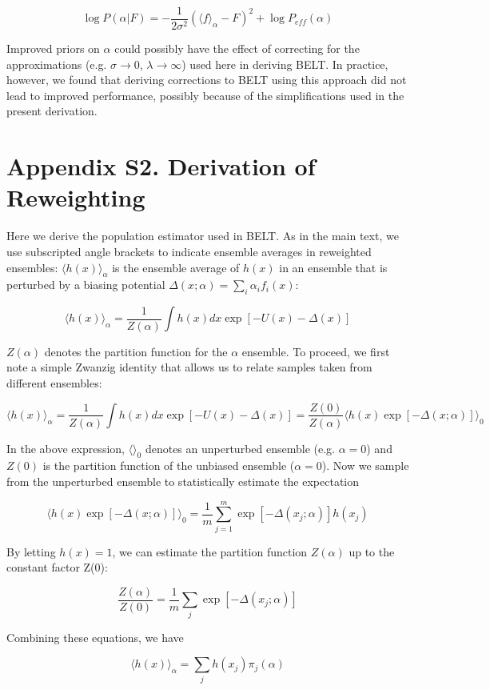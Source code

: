 \documentclass[12pt]{article}
\begin{document}
$$\log P(\alpha | F) = -\frac{1}{2\sigma^2} (\langle f \rangle_\alpha - F)^2 + \log P_{eff}(\alpha)$$

Improved priors on $\alpha$ could possibly have the effect of correcting for the approximations (e.g. $\sigma\rightarrow 0$, $\lambda \rightarrow \infty$) used here in deriving BELT.  In practice, however, we found that deriving corrections to BELT using this approach did not lead to improved performance, possibly because of the simplifications used in the present derivation.  


\section*{Appendix S2.  Derivation of Reweighting}

Here we derive the population estimator used in BELT.  As in the main text, we use subscripted angle brackets to indicate ensemble averages in reweighted ensembles: $\langle h(x)\rangle _\alpha$ is the ensemble average of $h(x)$ in an ensemble that is perturbed by a biasing potential $\Delta (x;\alpha) = \sum_i \alpha_i f_i(x)$:

$$\langle h(x)\rangle _\alpha = \frac{1}{Z(\alpha)} \int h(x) dx \exp[ -U(x) - \Delta(x)]$$

$Z(\alpha)$ denotes the partition function for the $\alpha$ ensemble.  To proceed, we first note a simple Zwanzig identity that allows us to relate samples taken from different ensembles:

$$\langle h(x)\rangle _\alpha = \frac{1}{Z(\alpha)} \int h(x) dx \exp[ -U(x) - \Delta(x)] = \frac{Z(0)}{Z(\alpha)} \langle h(x) \exp[-\Delta(x;\alpha)]\rangle _0 $$

In the above expression, $\langle \rangle_0$ denotes an unperturbed ensemble (e.g. $\alpha = 0$) and $Z(0)$ is the partition function of the unbiased ensemble ($\alpha = 0$).  Now we sample from the unperturbed ensemble to statistically estimate the expectation

$$\langle h(x) \exp[-\Delta(x;\alpha)]\rangle _0 = \frac{1}{m} \sum_{j = 1}^{m} \exp [ - \Delta(x_j;\alpha)] h(x_j)$$

By letting $h(x) = 1$, we can estimate the partition function $Z(\alpha)$ up to the constant factor Z(0):

$$ \frac{Z(\alpha)}{Z(0)} = \frac{1}{m} \sum_j \exp[-\Delta(x_j;\alpha)]$$

Combining these equations, we have

$$\langle h(x)\rangle _\alpha = \sum_j h(x_j) \pi_j(\alpha)$$
\end{document}
